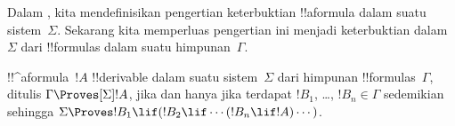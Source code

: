 \documentclass[../../../include/open-logic-section]{subfiles}
\begin{document}


Dalam , kita mendefinisikan pengertian keterbuktian
!!a{formula} dalam suatu sistem~$\Sigma$. Sekarang kita memperluas pengertian
ini menjadi keterbuktian dalam~$\Sigma$ dari !!{formula}s dalam suatu
himpunan~$\Gamma$.

\begin{defn}
  !!^a{formula}~$!A$ !!{derivable} dalam suatu sistem~$\Sigma$ dari himpunan
  !!{formula}s~$\Gamma$, ditulis $\Gamma\Proves[\Sigma]!A$, jika dan hanya
  jika terdapat $!B_1$, \dots, $!B_n\in\Gamma$ sedemikian sehingga
  $\Sigma\Proves !B_1\lif(!B_2\lif\cdots(!B_n\lif !A)\cdots)$.
\end{defn}
\end{document}
